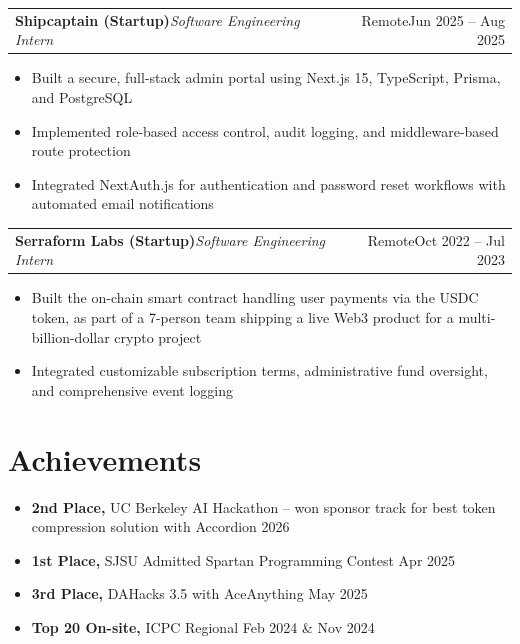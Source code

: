 \documentclass[letterpaper,11pt]{article}
\makeatletter
\newenvironment{bullets}{\small\begin{itemize}}{\end{itemize}\vspace{1pt}}
\newcommand{\sep}{\enspace\textbar\enspace}
\newcommand{\entry}[3]{%
  \begin{tabular*}{\linewidth}{@{}l@{\extracolsep{\fill}}r@{}}
    \textbf{#1}\sep\textit{\small #2} & {\small #3} \\
  \end{tabular*}\par}
\makeatother
\begin{document}
\entry{Shipcaptain (Startup)}{Software Engineering Intern}{Remote\sep Jun 2025 -- Aug 2025}
\begin{bullets}
  \item Built a secure, full-stack admin portal using Next.js 15, TypeScript, Prisma, and PostgreSQL
  \item Implemented role-based access control, audit logging, and middleware-based route protection
  \item Integrated NextAuth.js for authentication and password reset workflows with automated email notifications
\end{bullets}

\entry{Serraform Labs (Startup)}{Software Engineering Intern}{Remote\sep Oct 2022 -- Jul 2023}
\begin{bullets}
  \item Built the on-chain smart contract handling user payments via the USDC token, as part of a 7-person team shipping a live Web3 product for a multi-billion-dollar crypto project
  \item Integrated customizable subscription terms, administrative fund oversight, and comprehensive event logging
\end{bullets}

\section{Achievements}
\begin{bullets}
  \item \textbf{2nd Place,} UC Berkeley AI Hackathon -- won sponsor track for best token compression solution with Accordion \hfill 2026
  \item \textbf{1st Place,} SJSU Admitted Spartan Programming Contest \hfill Apr 2025
  \item \textbf{3rd Place,} DAHacks 3.5 with AceAnything \hfill May 2025
  \item \textbf{Top 20 On-site,} ICPC Regional \hfill Feb 2024 \& Nov 2024
\end{bullets}

\end{document}
